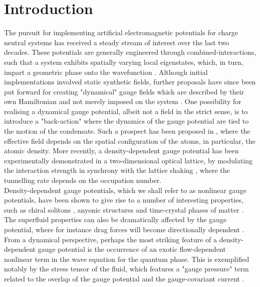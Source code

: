 \documentclass[twocolumn, nofootinbib, nobibnotes, amsmath,amssymb,aps, pra, floatfix]{revtex4-1}
\begin{document}
\section{Introduction}
The pursuit for implementing artificial electromagnetic potentials for charge neutral systems has received a steady stream of interest over the last two decades.
These potentials are generally engineered through combined-interactions, such that a system exhibits spatially varying local eigenstates, which, in turn, impart a geometric phase onto the wavefunction \cite{dalibard2011colloquium,goldman2014light,berry1984quantal,peskin1989aharonov}.
Although initial implementations involved static synthetic fields, further proposals have since been put forward for creating "dynamical" gauge fields which are described by their own Hamiltonian and not merely imposed on the system \cite{kapit2011optical,wiese2013ultracold,banerjee2012atomic,tagliacozzo2013simulation,zohar2013cold,tagliacozzo2013optical}.
One possibility for realising a dynamical gauge potential, albeit not a field in the strict sense, is to introduce a "back-action" where the dynamics of the gauge potential are tied to the motion of the condensate.
Such a prospect has been proposed in \cite{edmonds2013,edmonds2013josephson,keilmann2011statistically,greschner2014density,cardarelli2016engineering,PhysRevLett.115.053002,PhysRevLett.117.205303}, where the effective field depends on the spatial configuration of the atoms, in particular, the atomic density.
More recently, a density-dependent gauge potential has been experimentally demonstrated in a two-dimensional optical lattice, by modulating the interaction strength in synchrony with the lattice shaking \cite{PhysRevLett.121.030402}, where the tunnelling rate depends on the occupation number.\\
Density-dependent gauge potentials, which we shall refer to as nonlinear gauge potentials, have been shown to give rise to a number of interesting properties, such as chiral solitons \cite{edmonds2013,dingwall2018non,dingwall2019stability}, anyonic structures \cite{aglietti1996anyons} and time-crystal phases of matter \cite{ohberg2019quantum}.
The superfluid properties can also be dramatically affected by the gauge potential, where for instance drag forces will become directionally dependent \cite{buggy2019thesis}.
From a dynamical perspective, perhaps the most striking feature of a density-dependent gauge potential is the occurrence of an exotic flow-dependent nonlinear term in the wave equation for the quantum phase.
This is exemplified notably by the stress tensor of the fluid, which features a "gauge pressure" term related to the overlap of the gauge potential and the gauge-covariant current \cite{buggy2020hydrodynamics}.
\end{document}
